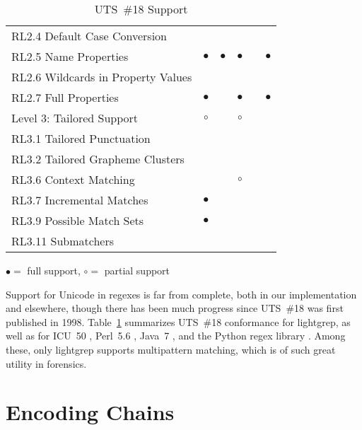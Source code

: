 \documentclass[5p,final,number,sort&compress]{elsarticle}
\begin{document}
\begin{table}
\begin{tabular}{l|c|c|c|c|c|}
RL2.4 Default Case Conversion      &           &           &           &           &           \\
RL2.5 Name Properties              & $\bullet$ & $\bullet$ & $\bullet$ &           & $\bullet$ \\
RL2.6 Wildcards in Property Values &           &           &           &           &           \\
RL2.7 Full Properties              & $\bullet$ &           & $\bullet$ &           & $\bullet$ \\
\hline
Level 3: Tailored Support          & $\circ$   &           & $\circ$   &           &           \\
\hline
RL3.1 Tailored Punctuation         &           &           &           &           &           \\
RL3.2 Tailored Grapheme Clusters   &           &           &           &           &           \\
RL3.6 Context Matching             &           &           & $\circ$   &           &           \\
RL3.7 Incremental Matches          & $\bullet$ &           &           &           &           \\
RL3.9 Possible Match Sets          & $\bullet$ &           &           &           &           \\
RL3.11 Submatchers                 &           &           &           &           &           \\
\hline
\end{tabular}

\medskip
$\bullet = $ full support, $\circ = $ partial support
\caption{UTS~\#18 Support\label{tab:uts18-support}}
\end{table}

Support for Unicode in regexes is far from complete, both in our implementation and elsewhere, though there has been much progress since UTS~\#18 was first published in 1998. Table~\ref{tab:uts18-support} summarizes UTS~\#18 conformance for lightgrep, as well as for ICU~50 \citep{icuregex}, Perl~5.6 \citep{perlunicode}, Java~7 \citep{jdk7pattern}, and the Python regex library \citep{pythonregex}.  Among these, only lightgrep supports multipattern matching, which is of such great utility in forensics.

\section{Encoding Chains}
\label{sec:chains}
\end{document}
